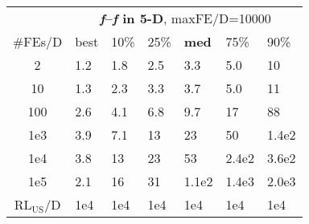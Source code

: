 \begin{tabular}{c|llllll}
 & \multicolumn{6}{|c}{\textbf{\textit{f}\raisebox{-0.35ex}{1}--\textit{f}\raisebox{-0.35ex}{24} in 5-D}, maxFE/D=10000}\\
\#FEs/D & best & 10\% & 25\% & \textbf{med} & 75\% & 90\%\\
2 & \hspace*{1ex}1.2 & \hspace*{1ex}1.8 & \hspace*{1ex}2.5 & \hspace*{1ex}3.3 & \hspace*{1ex}5.0 & 10\\
10 & \hspace*{1ex}1.3 & \hspace*{1ex}2.3 & \hspace*{1ex}3.3 & \hspace*{1ex}3.7 & \hspace*{1ex}5.0 & 11\\
100 & \hspace*{1ex}2.6 & \hspace*{1ex}4.1 & \hspace*{1ex}6.8 & \hspace*{1ex}9.7 & 17 & 88\\
1e3 & \hspace*{1ex}3.9 & \hspace*{1ex}7.1 & 13 & 23 & 50 & 1.4e2\\
1e4 & \hspace*{1ex}3.8 & 13 & 23 & 53 & 2.4e2 & 3.6e2\\
1e5 & \hspace*{1ex}2.1 & 16 & 31 & 1.1e2 & 1.4e3 & 2.0e3\\
$\text{RL}_{\text{US}}$/D & 1e4 & 1e4 & 1e4 & 1e4 & 1e4 & 1e4
\end{tabular}
